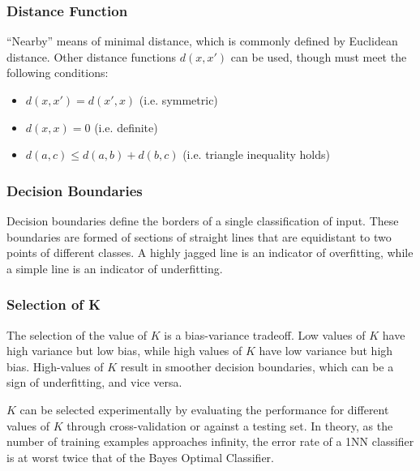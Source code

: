 \documentclass[12pt]{article}
\begin{document}
        \subsubsection{Distance Function}
            ``Nearby'' means of minimal distance, which is commonly defined by Euclidean distance. Other distance functions $d(x, x')$ can be used, though must meet
            the following conditions:
            \begin{itemize}
              \item $d(x, x') = d(x', x)$ (i.e. symmetric)
              \item $d(x, x) = 0$ (i.e. definite)
              \item $d(a, c) \leq d(a, b) + d(b, c)$ (i.e. triangle inequality holds)
            \end{itemize}

        \subsubsection{Decision Boundaries}
            Decision boundaries define the borders of a single classification of input. These boundaries are formed of sections of straight lines that are equidistant
            to two points of different classes. A highly jagged line is an indicator of overfitting, while a simple line is an indicator of underfitting.

        \subsubsection{Selection of K}
            The selection of the value of $K$ is a bias-variance tradeoff. Low values of $K$ have high variance but low bias, while high values of $K$ have low variance
            but high bias. High-values of $K$ result in smoother decision boundaries, which can be a sign of underfitting, and vice versa.

            $K$ can be selected experimentally by evaluating the performance for different values of $K$ through cross-validation or against a testing set. In theory, as
            the number of training examples approaches infinity, the error rate of a 1NN classifier is at worst twice that of the Bayes Optimal Classifier.
\end{document}
